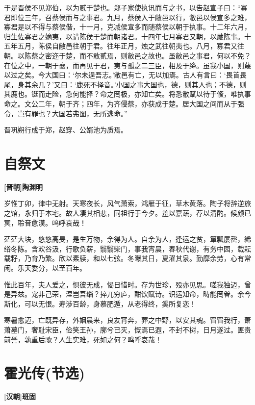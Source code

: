\documentclass[UTF8,titlepage,oneside]{ctexbook}
\begin{document}
于是晋侯不见郑伯，以为贰于楚也。郑子家使执讯而与之书，以告赵宣子曰：“寡君即位三年，召蔡侯而与之事君。九月，蔡侯入于敝邑以行，敝邑以侯宣多之难，寡君是以不得与蔡侯偕，十一月，克减侯宣多而随蔡侯以朝于执事。十二年六月，归生佐寡君之嫡夷，以请陈侯于楚而朝诸君。十四年七月寡君又朝，以蒇陈事。十五年五月，陈侯自敝邑往朝于君。往年正月，烛之武往朝夷也。八月，寡君又往朝。以陈蔡之密迩于楚，而不敢贰焉，则敝邑之故也。虽敝邑之事君，何以不免？在位之中，一朝于襄，而再见于君，夷与孤之二三臣，相及于绛。虽我小国，则蔑以过之矣。今大国曰：‘尔未逞吾志。’敝邑有亡，无以加焉。古人有言曰：‘畏首畏尾，身其余几？’又曰：‘鹿死不择音。’小国之事大国也，德，则其人也；不德，则其鹿也。铤而走险，急何能择？命之罔极，亦知亡矣。将悉敝赋以待于鯈，唯执事命之。文公二年，朝于齐；四年，为齐侵蔡，亦获成于楚。居大国之间而从于强令，岂有罪也？大国若弗图，无所逃命。”


晋巩朔行成于郑，赵穿、公婿池为质焉。



\chapter*{自祭文}
\begin{center}
	\textbf{[晋朝]陶渊明}
\end{center}

岁惟丁卯，律中无射。天寒夜长，风气萧索，鸿雁于征，草木黄落。陶子将辞逆旅之馆，永归于本宅。故人凄其相悲，同祖行于今夕。羞以嘉蔬，荐以清酌。候颜已冥，聆音愈漠。呜呼哀哉！

茫茫大块，悠悠高旻，是生万物，余得为人。自余为人，逢运之贫，箪瓢屡罄，絺绤冬陈。含欢谷汲，行歌负薪，翳翳柴门，事我宵晨，春秋代谢，有务中园，载耘载籽，乃育乃繁。欣以素牍，和以七弦。冬曝其日，夏濯其泉。勤靡余劳，心有常闲。乐天委分，以至百年。

惟此百年，夫人爱之，惧彼无成，愒日惜时。存为世珍，殁亦见思。嗟我独迈，曾是异兹。宠非己荣，涅岂吾缁？捽兀穷庐，酣饮赋诗。识运知命，畴能罔眷。余今斯化，可以无恨。寿涉百龄，身慕肥遁，从老得终，奚所复恋！

寒暑愈迈，亡既异存，外姻晨来，良友宵奔，葬之中野，以安其魂。窅窅我行，萧萧墓门，奢耻宋臣，俭笑王孙，廓兮已灭，慨焉已遐，不封不树，日月遂过。匪贵前誉，孰重后歌？人生实难，死如之何？鸣呼哀哉！


\chapter*{霍光传(节选)}
\begin{center}
	\textbf{[汉朝]班固}
\end{center}
\end{document}
